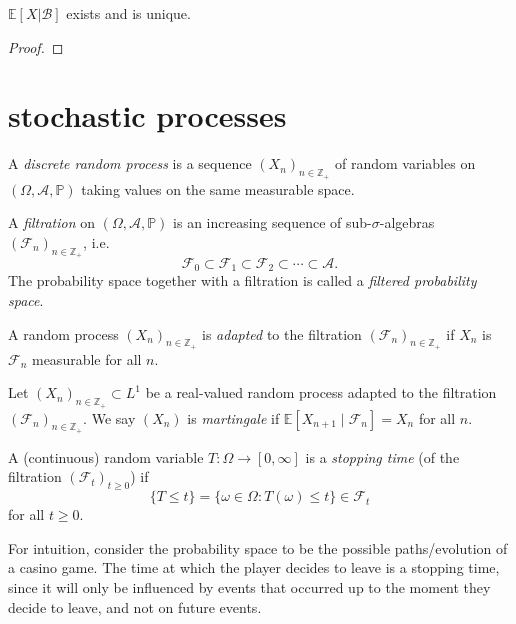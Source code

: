 \documentclass[12pt]{article}
\begin{document}
\begin{theorem}
	$\mathbb{E}[ X | \mathcal{B} ]$ exists and is unique.
\end{theorem}
\begin{proof}
\end{proof}


\section{stochastic processes} %

\begin{definition}
	A \emph{discrete random process} is a sequence $(X_n)_{n\in\mathbb{Z_+}}$ of random variables on $(\Omega,\mathcal{A},\mathbb{P})$ taking values on the same measurable space.
\end{definition}

\begin{definition}
	A \emph{filtration} on $(\Omega,\mathcal{A},\mathbb{P})$ is an increasing sequence of sub-$\sigma$-algebras $(\mathcal{F}_n)_{n\in\mathbb{Z}_+}$, i.e.
	\begin{equation*}
		\mathcal{F}_0 \subset \mathcal{F}_1 \subset \mathcal{F}_2 \subset \cdots \subset \mathcal{A}.
	\end{equation*}
	The probability space together with a filtration is called a \emph{filtered probability space}.
\end{definition}

\begin{definition}
	A random process $(X_n)_{n\in\mathbb{Z}_+}$ is \emph{adapted} to the filtration $(\mathcal{F}_n)_{n\in\mathbb{Z}_+}$ if $X_n$ is $\mathcal{F}_n$ measurable for all $n$.
\end{definition}

\begin{definition}
	Let $(X_n)_{n\in\mathbb{Z}_+}\subset L^1$ be a real-valued random process adapted to the filtration $(\mathcal{F}_n)_{n\in\mathbb{Z}_+}$. We say $(X_n)$ is \emph{martingale} if $\mathbb{E}[X_{n+1}\mid \mathcal{F}_n] = X_n$ for all $n$.
\end{definition}

\begin{definition}
	A (continuous) random variable $T:\Omega\to[0,\infty]$ is a \emph{stopping time} (of the filtration $(\mathcal{F}_t)_{t\geq 0}$) if 
	\begin{equation*}
		\{T \leq t \} = \{\omega\in\Omega : T(\omega) \leq t\} \in \mathcal{F}_t
	\end{equation*}
	for all $t\geq 0$.
\end{definition}
\begin{remark}
	For intuition, consider the probability space to be the possible paths/evolution of a casino game. The time at which the player decides to leave is a stopping time, since it will only be influenced by events that occurred up to the moment they decide to leave, and not on future events.
\end{remark}
\end{document}
